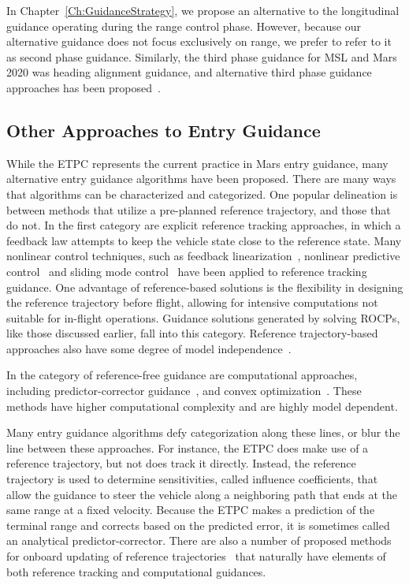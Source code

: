 In Chapter~\ref{Ch:GuidanceStrategy}, we propose an alternative to the longitudinal guidance operating during the range control phase. However, because our alternative guidance does not focus exclusively on range, we prefer to refer to it as second phase guidance. Similarly, the third phase guidance for MSL and Mars 2020 was heading alignment guidance, and alternative third phase guidance approaches has been proposed~\cite{GuangfeiDissertation}.

\subsection{Other Approaches to Entry Guidance}

While the ETPC represents the current practice in Mars entry guidance, many alternative entry guidance algorithms have been proposed. There are many ways that algorithms can be characterized and categorized. One popular delineation is between methods that utilize a pre-planned reference trajectory, and those that do not. In the first category are explicit reference tracking approaches, in which a feedback law attempts to keep the vehicle state close to the reference state. Many nonlinear control techniques, such as feedback linearization~\cite{FeedbackLinearization}, nonlinear predictive control~\cite{NMPC,JoelController} and sliding mode control~\cite{SlidingModeEG1} have been applied to reference tracking guidance. 
One advantage of reference-based solutions is the flexibility in designing the reference trajectory before flight, allowing for intensive computations not suitable for in-flight operations. Guidance solutions generated by solving ROCPs, like those discussed earlier, fall into this category. Reference trajectory-based approaches also have some degree of model independence~\cite{joel_dissertation}.

In the category of reference-free guidance are computational approaches, including predictor-corrector guidance~\cite{EntryPredictCorrect}, and convex optimization~\cite{MaxCrossrangeConvexLu,ConvexEntryGuidance}. These methods have higher computational complexity and are highly model dependent.

Many entry guidance algorithms defy categorization along these lines, or blur the line between these approaches. For instance, the ETPC does make use of a reference trajectory, but not does track it directly. Instead, the reference trajectory is used to determine sensitivities, called influence coefficients, that allow the guidance to steer the vehicle along a neighboring path that ends at the same range at a fixed velocity. Because the ETPC makes a prediction of the terminal range and corrects based on the predicted error, it is sometimes called an analytical predictor-corrector. There are also a number of proposed methods for onboard updating of reference trajectories~\cite{GuangfeiReplanning} that naturally have elements of both reference tracking and computational guidances.



